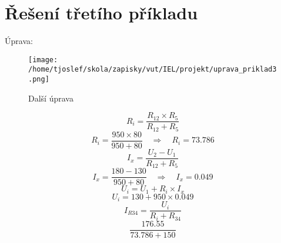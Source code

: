\documentclass{article}
\begin{document}
\section{Řešení třetího příkladu}
Úprava:

\begin{figure}[!ht]
  \centering
  \texttt{[image: /home/tjoslef/skola/zapisky/vut/IEL/projekt/uprava\_priklad3.png]}
  \caption{Další úprava}
  \label{fig:upravapriklad3}
\end{figure}

\[
    R_i = \frac{R_{12} \times R_5}{R_{12} + R_5}
\]
\[
    R_i = \frac{950 \times 80}{950 + 80} \quad \Rightarrow \quad R_i = 73.786
\]
\[
    I_x = \frac{U_2 - U_1}{R_{12} + R_5}
\]
\[
    I_x = \frac{180 - 130}{950 + 80} \quad \Rightarrow \quad I_x = 0.049
\]
\[
    U_i = U_1 + R_i \times I_x
\]
\[
    U_i = 130 + 950 \times 0.049
\]
\[
    I_{R34} = \frac{U_i}{R_i + R_{34}}
\]
\[
    \frac{176.55}{73.786 + 150}
\]
\end{document}
